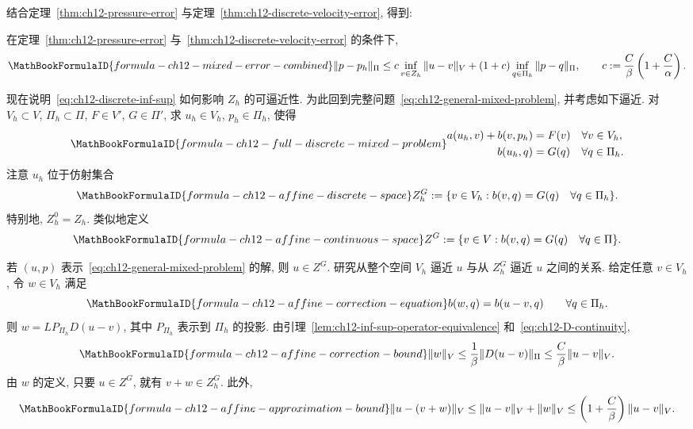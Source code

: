 结合定理~\ref{thm:ch12-pressure-error} 与定理~\ref{thm:ch12-discrete-velocity-error}, 得到:
\begin{Corollary}
\label{cor:ch12-mixed-error-combined}
在定理~\ref{thm:ch12-pressure-error} 与~\ref{thm:ch12-discrete-velocity-error} 的条件下,
\[
\MathBookFormulaID{formula-ch12-mixed-error-combined}
\|p-p_h\|_\Pi
\leq c\inf_{v\in Z_h}\|u-v\|_V
+(1+c)\inf_{q\in\Pi_h}\|p-q\|_\Pi,
\qquad
c:=\frac C\beta\left(1+\frac C\alpha\right).
\]
\end{Corollary}

现在说明~\eqref{eq:ch12-discrete-inf-sup} 如何影响 $Z_h$ 的可逼近性. 为此回到完整问题~\eqref{eq:ch12-general-mixed-problem}, 并考虑如下逼近. 对 $V_h\subset V$, $\Pi_h\subset\Pi$, $F\in V'$, $G\in\Pi'$, 求 $u_h\in V_h$, $p_h\in\Pi_h$, 使得
\begin{equation}
\MathBookFormulaID{formula-ch12-full-discrete-mixed-problem}
\label{eq:ch12-full-discrete-mixed-problem}
\begin{aligned}
a(u_h,v)+b(v,p_h)&=F(v)&&\forall v\in V_h,\\
b(u_h,q)&=G(q)&&\forall q\in\Pi_h.
\end{aligned}
\end{equation}
注意 $u_h$ 位于仿射集合
\begin{equation}
\MathBookFormulaID{formula-ch12-affine-discrete-space}
\label{eq:ch12-affine-discrete-space}
Z_h^G:=\{v\in V_h:b(v,q)=G(q)\quad\forall q\in\Pi_h\}.
\end{equation}
特别地, $Z_h^0=Z_h$. 类似地定义
\begin{equation}
\MathBookFormulaID{formula-ch12-affine-continuous-space}
\label{eq:ch12-affine-continuous-space}
Z^G:=\{v\in V:b(v,q)=G(q)\quad\forall q\in\Pi\}.
\end{equation}

若 $(u,p)$ 表示~\eqref{eq:ch12-general-mixed-problem} 的解, 则 $u\in Z^G$. 研究从整个空间 $V_h$ 逼近 $u$ 与从 $Z_h^G$ 逼近 $u$ 之间的关系. 给定任意 $v\in V_h$, 令 $w\in V_h$ 满足
\[
\MathBookFormulaID{formula-ch12-affine-correction-equation}
b(w,q)=b(u-v,q)\qquad\forall q\in\Pi_h.
\]
则 $w=LP_{\Pi_h}D(u-v)$, 其中 $P_{\Pi_h}$ 表示到 $\Pi_h$ 的投影. 由引理~\ref{lem:ch12-inf-sup-operator-equivalence} 和~\eqref{eq:ch12-D-continuity},
\[
\MathBookFormulaID{formula-ch12-affine-correction-bound}
\|w\|_V\leq\frac1\beta\|D(u-v)\|_\Pi
\leq\frac C\beta\|u-v\|_V.
\]
由 $w$ 的定义, 只要 $u\in Z^G$, 就有 $v+w\in Z_h^G$. 此外,
\[
\MathBookFormulaID{formula-ch12-affine-approximation-bound}
\|u-(v+w)\|_V\leq\|u-v\|_V+\|w\|_V
\leq\left(1+\frac C\beta\right)\|u-v\|_V.
\]

